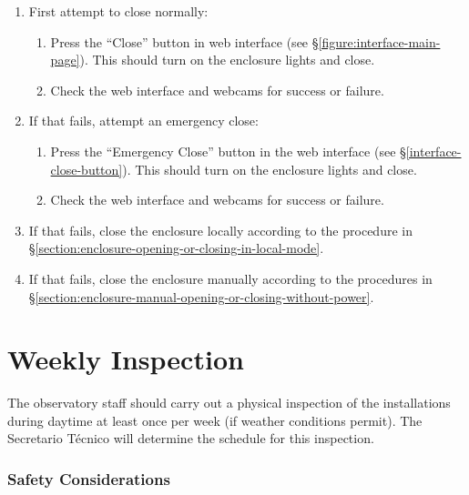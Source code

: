 \begin{enumerate}
\item
First attempt to close normally:
\begin{enumerate}
\item
Press the “Close” button in web interface (see \S\ref{figure:interface-main-page}). This should turn on the enclosure lights and close.
\item
Check the web interface and webcams for success or failure.
\end{enumerate}
\item
If that fails, attempt an emergency close:
\begin{enumerate}
\item
Press the “Emergency Close” button in the web interface (see \S\ref{interface-close-button}). This should turn on the enclosure lights and close.
\item
Check the web interface and webcams for success or failure.
\end{enumerate}
\item
If that fails, close the enclosure locally according to the procedure in \S\ref{section:enclosure-opening-or-closing-in-local-mode}.
\item
If that fails, close the enclosure manually according to the procedures in %
\S\ref{section:enclosure-manual-opening-or-closing-without-power}.
\end{enumerate}

\section{Weekly Inspection}

The observatory staff should carry out a physical inspection of the installations during daytime at least once per week (if weather conditions permit). The Secretario Técnico will determine the schedule for this inspection.

\subsubsection{Safety Considerations}



